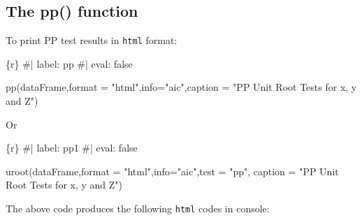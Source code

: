 \documentclass[
  letterpaper,
  DIV=11,
  numbers=noendperiod]{scrartcl}
\newenvironment{Shaded}{\begin{snugshade}}{\end{snugshade}}
\newcommand{\AttributeTok}[1]{\textcolor[rgb]{0.40,0.45,0.13}{#1}}
\newcommand{\CommentTok}[1]{\textcolor[rgb]{0.37,0.37,0.37}{#1}}
\newcommand{\FunctionTok}[1]{\textcolor[rgb]{0.28,0.35,0.67}{#1}}
\newcommand{\InformationTok}[1]{\textcolor[rgb]{0.37,0.37,0.37}{#1}}
\newcommand{\NormalTok}[1]{\textcolor[rgb]{0.00,0.23,0.31}{#1}}
\newcommand{\StringTok}[1]{\textcolor[rgb]{0.13,0.47,0.30}{#1}}
\begin{document}
\hypertarget{the-pp-function}{%
\subsection{The pp() function}\label{the-pp-function}}

To print PP test results in \texttt{html} format:

\begin{Shaded}
\begin{Highlighting}[]
\InformationTok{\textasciigrave{}\textasciigrave{}\textasciigrave{}\{r\}}
\CommentTok{\#| label: pp}
\CommentTok{\#| eval: false}

\FunctionTok{pp}\NormalTok{(dataFrame,}\AttributeTok{format =} \StringTok{"html"}\NormalTok{,}\AttributeTok{info=}\StringTok{"aic"}\NormalTok{,}\AttributeTok{caption =} \StringTok{"PP Unit Root Tests for x, y and Z"}\NormalTok{)}
\InformationTok{\textasciigrave{}\textasciigrave{}\textasciigrave{}}
\end{Highlighting}
\end{Shaded}

Or

\begin{Shaded}
\begin{Highlighting}[]
\InformationTok{\textasciigrave{}\textasciigrave{}\textasciigrave{}\{r\}}
\CommentTok{\#| label: pp1}
\CommentTok{\#| eval: false}

\FunctionTok{uroot}\NormalTok{(dataFrame,}\AttributeTok{format =} \StringTok{"html"}\NormalTok{,}\AttributeTok{info=}\StringTok{"aic"}\NormalTok{,}\AttributeTok{test =} \StringTok{"pp"}\NormalTok{,}
      \AttributeTok{caption =} \StringTok{"PP Unit Root Tests for x, y and Z"}\NormalTok{)}
\InformationTok{\textasciigrave{}\textasciigrave{}\textasciigrave{}}
\end{Highlighting}
\end{Shaded}

The above code produces the following \texttt{html} codes in console:
\end{document}
